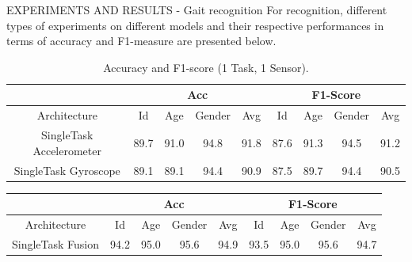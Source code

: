 \begin{frame}{EXPERIMENTS AND RESULTS - Gait recognition}
    For recognition, different types of experiments on different models and 
    their respective performances in terms of accuracy and F1-measure are 
    presented below.
    \begin{minipage}{\linewidth}
        \centering
        \begin{minipage}{0.45\linewidth}
            \begin{table}[h!]
            \centering
                \begin{adjustbox}{max width=\textwidth}
                \begin{tabular}{|c||ccc|c||ccc|c|}
                    \hline
                        & \multicolumn{4}{c||}{Acc} & \multicolumn{4}{c|}{F1-Score} \\
                    \hline
                        Architecture & Id & Age & Gender & Avg & Id & Age & Gender & Avg\\
                    \hline
                        SingleTask Accelerometer & 89.7 & 91.0 & 94.8 & 91.8 & 87.6 & 91.3 & 94.5 & 91.2\\
                        SingleTask Gyroscope& 89.1 & 89.1 & 94.4 & 90.9 & 87.5 & 89.7 & 94.4 & 90.5\\
                    \hline 
                \end{tabular}
                \end{adjustbox}
                \caption{Accuracy and F1-score (1 Task, 1 Sensor).}
                \label{table accuracy and F1 (1 Task - 1 Sensor)}
            \end{table}
            \centering
            \begin{table}[h!]
                \centering
                \begin{adjustbox}{max width=\textwidth}
                \begin{tabular}{|c||ccc|c||ccc|c|}
                    \hline
                        & \multicolumn{4}{c||}{Acc} & \multicolumn{4}{c|}{F1-Score} \\
                    \hline
                        Architecture & Id & Age & Gender & Avg & Id & Age & Gender & Avg\\
                    \hline
                        SingleTask Fusion & 94.2 & 95.0 & 95.6 & 94.9 & 93.5 & 95.0 & 95.6 & 94.7\\
                    \hline 
                \end{tabular}

\end{adjustbox}
\end{table}
\end{minipage}
\end{minipage}
\end{frame}
